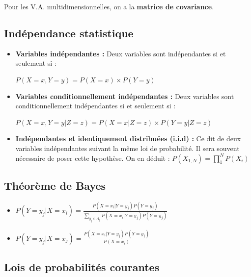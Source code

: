 \documentclass{article}
\begin{document}
Pour les V.A. multidimensionnelles, on a la \textbf{matrice de covariance}.

\subsection{Indépendance statistique}

\begin{itemize}

\item \textbf{Variables indépendantes :} Deux variables sont indépendantes si et seulement si :

$ P(X = x, Y = y) = P(X = x) \times P(Y = y) $

\item \textbf{Variables conditionnellement indépendantes :} Deux variables sont conditionnellement indépendantes si et seulement si :

$ P(X = x, Y = y | Z = z) = P(X = x | Z = z) \times P(Y = y | Z = z) $

\item \textbf{Indépendantes et identiquement distribuées (i.i.d) :} Ce dit de deux variables indépendantes suivant la même loi de probabilité. Il sera souvent nécessaire de poser cette hypothèse. On en déduit : $P(X_{1, N} ) = \prod_{1}^{N} P(X_i)$

\end{itemize}

\subsection{Théorème de Bayes}

\begin{itemize}

\item $ P(Y = y_j | X = x_i) = \frac{P(X = x_i | Y = y_j) P(Y = y_j)}{\sum_{y_j \in A_y} P(X = x_i | Y = y_j) P(Y = y_j)}  $

\item $ P(Y = y_j | X = x_j) = \frac{P(X = x_i | Y = y_j) P(Y = y_j)}{P(X = x_i)} $

\end{itemize}

\subsection{Lois de probabilités courantes}
\end{document}
